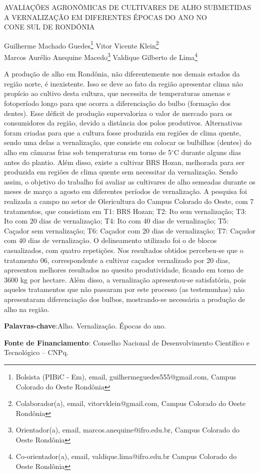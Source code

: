 \documentclass[article,12pt,onesidea,4paper,english,brazil]{abntex2}
\begin{document}
	
	
	\frenchspacing 
	
	\begin{center}
		\LARGE AVALIAÇÕES AGRONÔMICAS DE CULTIVARES DE ALHO SUBMETIDAS A
		VERNALIZAÇÃO EM DIFERENTES ÉPOCAS DO ANO NO\\CONE SUL DE
		RONDÔNIA
		
		\normalsize
		Guilherme Machado Guedes\footnote{Bolsista (PIBiC - Em), email, guilhermeguedes555@gmail.com, Campus Colorado do Oeste
			Rondônia} 
		Vitor Vicente Klein\footnote{Colaborador(a), email, vitorvklein@gmail.com, Campus Colorado do Oeste Rondônia} \\
		Marcos Aurélio Anequine Macedo\footnote{Orientador(a), email, marcos.anequine@ifro.edu.br, Campus Colorado do Oeste Rondônia} 
	Valdique
	Gilberto de Lima\footnote{Co-orientador(a), email, valdique.lima@ifro.edu.br Campus Colorado do Oeste Rondônia} 
	\end{center}
	
	\noindent A produção de alho em Rondônia, não diferentemente nos demais estados da região
	norte, é inexistente. Isso se deve ao fato da região apresentar clima não propício ao
	cultivo desta cultura, que necessita de temperaturas amenas e fotoperíodo longo
	para que ocorra a diferenciação do bulbo (formação dos dentes). Esse déficit de
	produção supervaloriza o valor de mercado para os consumidores da região, devido
	a distância dos polos produtivos. Alternativas foram criadas para que a cultura fosse
	produzida em regiões de clima quente, sendo uma delas a vernalização, que
	consiste em colocar os bulbilhos (dentes) do alho em câmaras frias sob
	temperaturas em torno de 5$^\circ$C durante alguns dias antes do plantio. Além disso,
	existe a cultivar BRS Hozan, melhorada para ser produzida em regiões de clima
	quente sem necessitar da vernalização. Sendo assim, o objetivo do trabalho foi
	avaliar as cultivares de alho semeadas durante os meses de março a agosto em
	diferentes períodos de vernalização. A pesquisa foi realizada a campo no setor de
	Olericultura do Campus Colorado do Oeste, com 7 tratamentos, que consistiam em
	T1: BRS Hozan; T2: Ito sem vernalização; T3: Ito com 20 dias de vernalização; T4:
	Ito com 40 dias de vernalização; T5: Caçador sem vernalização; T6: Caçador com
	20 dias de vernalização; T7: Caçador com 40 dias de vernalização. O delineamento
	utilizado foi o de blocos casualizados, com quatro repetições. Nos resultados obtidos
	percebeu-se que o tratamento 06, correspondente a cultivar caçador vernalizado por
	20 dias, apresentou melhores resultados no quesito produtividade, ficando em torno
	de 3600 kg por hectare. Além disso, a vernalização apresentou-se satisfatória, pois
	aqueles tratamentos que não passaram por este processo (as testemunhas) não
	apresentaram diferenciação dos bulbos, mostrando-se necessária a produção de
	alho na região.
	
	\vspace{\onelineskip}
	
	\noindent
	\textbf{Palavras-chave}:Alho. Vernalização. Épocas do ano.
	
	\noindent
	\textbf{Fonte de Financiamento}: Conselho Nacional de Desenvolvimento Científico e
	Tecnológico – CNPq.
	
\end{document}
